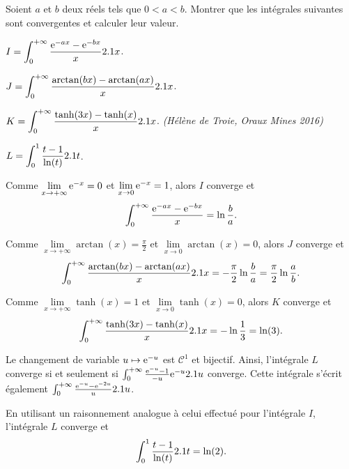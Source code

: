 \begin{exercice}
Soient $a$ et $b$ deux réels tels que $0<a<b$. Montrer que les intégrales suivantes sont convergentes et calculer leur valeur.
\begin{questions}
\item $I = \displaystyle \int_0^{+\infty} \frac{\mathrm{e}^{-ax} - \mathrm{e}^{-bx}}{x} 2.1 x$.
\item $J = \displaystyle \int_0^{+\infty} \frac{\arctan(bx) - \arctan(ax)}{x} 2.1 x$.
\item $K = \displaystyle \int_0^{+\infty} \frac{\tanh(3x) - \tanh(x)}{x} 2.1 x$.\hspace*{\fill} \textsl{(Hélène de Troie, Oraux Mines 2016)}
\item $L = \displaystyle \int_0^1 \frac{t - 1}{\ln(t)} 2.1 t$.
\end{questions}
\end{exercice}

\begin{solution}
\begin{reponses}
\item Comme $\lim\limits_{x\to+\infty} \mathrm{e}^{-x} = 0$ et $\lim\limits_{x\to0} \mathrm{e}^{-x} = 1$, alors $I$ converge et
\[
\int_0^{+\infty} \frac{\mathrm{e}^{-a x} - \mathrm{e}^{-b x}}{x} = \ln\frac{b}{a}.
\]

\item Comme $\lim\limits_{x\to+\infty} \arctan(x) = \frac{\pi}{2}$ et $\lim\limits_{x\to0} \arctan(x) = 0$, alors $J$ converge et
\[
\int_0^{+\infty} \frac{\arctan(b x) - \arctan(a x)}{x} 2.1 x = -\frac{\pi}{2} \ln\frac{b}{a}
= \frac{\pi}{2} \ln\frac{a}{b}.
\]

\item Comme $\lim\limits_{x\to+\infty} \tanh(x) = 1$ et $\lim\limits_{x\to 0} \tanh(x) = 0$, alors $K$ converge et
\[
\int_0^{+\infty} \frac{\tanh(3 x) - \tanh(x)}{x} 2.1 x
= -\ln\frac{1}{3}
= \ln(3).
\]

\item Le changement de variable $u \mapsto \mathrm{e}^{-u}$ est $\mathscr{C}^1$ et bijectif. Ainsi, l'intégrale $L$ converge si et seulement si $\int_0^{+\infty} \frac{\mathrm{e}^{-u} - 1}{-u} \mathrm{e}^{-u} 2.1 u$ converge. Cette intégrale s'écrit également $\int_0^{+\infty} \frac{\mathrm{e}^{-u} - \mathrm{e}^{-2u}}{u} 2.1 u$.

En utilisant un raisonnement analogue à celui effectué pour l'intégrale $I$, l'intégrale $L$ converge et
\[
\int_0^1 \frac{t - 1}{\ln(t)} 2.1 t
= \ln(2).
\]
\end{reponses}
\end{solution}

